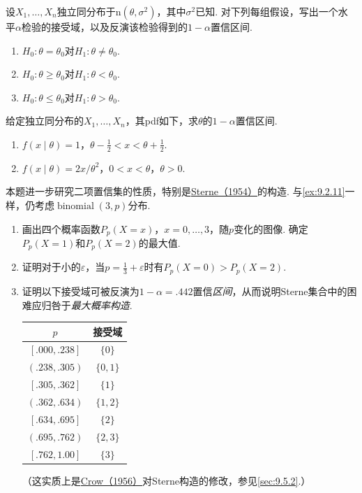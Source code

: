 \begin{exercise}\label{exercise:9.16}
设$X_1,\ldots,X_n$独立同分布于$\mathrm n(\theta,\sigma^2)$，其中$\sigma^2$已知. 对下列每组假设，写出一个水平$\alpha$检验的接受域，以及反演该检验得到的$1-\alpha$置信区间.
\begin{enumerate}
\item $H_0:\theta=\theta_0$对$H_1:\theta\ne\theta_0$.
\item $H_0:\theta\ge\theta_0$对$H_1:\theta<\theta_0$.
\item $H_0:\theta\le\theta_0$对$H_1:\theta>\theta_0$.
\end{enumerate}
\end{exercise}
\begin{exercise}\label{exercise:9.17}
给定独立同分布的$X_1,\ldots,X_n$，其pdf如下，求$\theta$的$1-\alpha$置信区间.
\begin{enumerate}
\item $f(x\mid\theta)=1$，$\theta-\tfrac12<x<\theta+\tfrac12$.
\item $f(x\mid\theta)=2x/\theta^2$，$0<x<\theta$，$\theta>0$.
\end{enumerate}
\end{exercise}
\begin{exercise}\label{exercise:9.18}
本题进一步研究二项置信集的性质，特别是\hyperref[bib:source305]{Sterne（1954）}的构造. 与\autoref{ex:9.2.11}一样，仍考虑$\operatorname{binomial}(3,p)$分布.
\begin{enumerate}
\item 画出四个概率函数$P_p(X=x)$，$x=0,\ldots,3$，随$p$变化的图像. 确定$P_p(X=1)$和$P_p(X=2)$的最大值.
\item 证明对于小的$\varepsilon$，当$p=\frac13+\varepsilon$时有$P_p(X=0)>P_p(X=2)$.
\item 证明以下接受域可被反演为$1-\alpha=.442$置信\emph{区间}，从而说明Sterne集合中的困难应归咎于\emph{最大概率构造}.
\begin{center}\begin{tabular}{cc}\toprule
$p$&接受域\\\midrule
$[.000,.238]$&$\{0\}$\\
$(.238,.305)$&$\{0,1\}$\\
$[.305,.362]$&$\{1\}$\\
$(.362,.634)$&$\{1,2\}$\\
$[.634,.695]$&$\{2\}$\\
$(.695,.762)$&$\{2,3\}$\\
$[.762,1.00]$&$\{3\}$\\\bottomrule
\end{tabular}\end{center}
（这实质上是\hyperref[bib:source88]{Crow（1956）}对Sterne构造的修改，参见\autoref{sec:9.5.2}.）
\end{enumerate}
\end{exercise}
